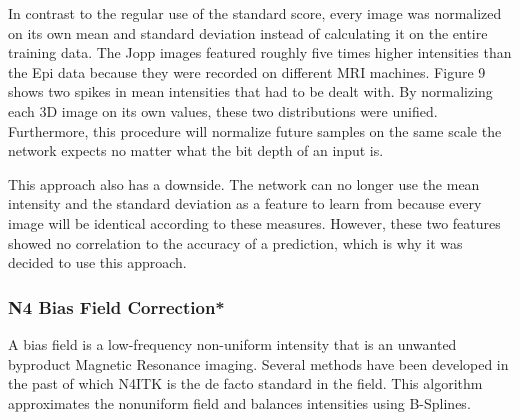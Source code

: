In contrast to the regular use of the standard score, every image was normalized on its own mean and standard deviation instead of calculating it on the entire training data. The Jopp images featured roughly five times higher intensities than the Epi data because they were recorded on different MRI machines. Figure 9 shows two spikes in mean intensities that had to be dealt with. By normalizing each 3D image on its own values, these two distributions were unified. Furthermore, this procedure will normalize future samples on the same scale the network expects no matter what the bit depth of an input is.

This approach also has a downside. The network can no longer use the mean intensity and the standard deviation as a feature to learn from because every image will be identical according to these measures. However, these two features showed no correlation to the accuracy of a prediction, which is why it was decided to use this approach.

\subsubsection{N4 Bias Field Correction*}

A bias field is a low-frequency non-uniform intensity that is an unwanted byproduct Magnetic Resonance imaging. Several methods have been developed in the past of which N4ITK \cite{Tustison2010} is the de facto standard in the field. This algorithm approximates the nonuniform field and balances intensities using B-Splines. 

